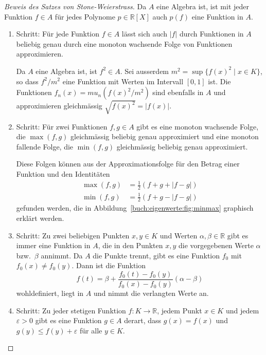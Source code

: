 \begin{proof}[Beweis des Satzes von Stone-Weierstrass]
%
%
Da $A$ eine Algebra ist, ist mit jeder Funktion $f\in A$ für jedes Polynome
$p\in\mathbb{R}[X]$ auch $p(f)$ eine Funktion in $A$.
\begin{enumerate}
\item Schritt: Für jede Funktion $f\in A$ lässt sich auch $|f|$ durch
Funktionen in $A$ beliebig genau durch eine monoton wachsende Folge
von Funktionen approximieren.

Da $A$ eine Algebra ist, ist $f^2\in A$.
Sei ausserdem $m^2=\sup \{f(x)^2\;|\;x\in K\}$, so dass $f^2/m^2$ eine Funktion
mit Werten im Intervall $[0,1]$ ist.
Die Funktionen $f_n(x)=mu_n(f(x)^2/m^2)$ sind ebenfalls in $A$ und
approximieren gleichmässig $\sqrt{f(x)^2}=|f(x)|$.

\item Schritt: Für zwei Funktionen $f,g\in A$ gibt es eine monoton wachsende
Folge, die $\max(f,g)$ gleichmässig beliebig genau approximiert
und eine monoton fallende Folge, die $\min(f,g)$ gleichmässig beliebig 
genau approximiert.

Diese Folgen können aus der Approximationsfolge für den Betrag einer
Funktion und den Identitäten
\begin{equation}
\begin{aligned}
\max(f,g) &= \frac12(f+g+|f-g|) \\
\min(f,g) &= \frac12(f+g-|f-g|) 
\end{aligned}
\label{buch:eigenwerte:eqn:minmax}
\end{equation}
gefunden werden, die in Abbildung~\ref{buch:eigenwerte:fig:minmax}
graphisch erklärt werden.

\item Schritt: Zu zwei beliebigen Punkten $x,y\in K$ und Werten
$\alpha,\beta\in\mathbb{R}$ gibt es immer eine Funktion in $A$,
die in den Punkten $x,y$ die vorgegebenen Werte $\alpha$ bzw.~$\beta$
annimmt.
Da $A$ die Punkte trennt, gibt es eine Funktion $f_0$ mit $f_0(x)\ne f_0(y)$.
Dann ist die Funktion
\[
f(t)
=
\beta + \frac{f_0(t)-f_0(y)}{f_0(x)-f_0(y)}(\alpha-\beta)
\]
wohldefiniert, liegt in $A$ und nimmt die verlangten Werte an.

\item Schritt: Zu jeder stetigen Funktion $f\colon K\to\mathbb{R}$, jedem
Punkt $x\in K$ und jedem $\varepsilon>0$ gibt es eine Funktion $g\in A$ derart,
dass $g(x)=f(x)$ und $g(y) \le f(y)+\varepsilon$ für alle $y\in K$.


\end{enumerate}
\end{proof}
